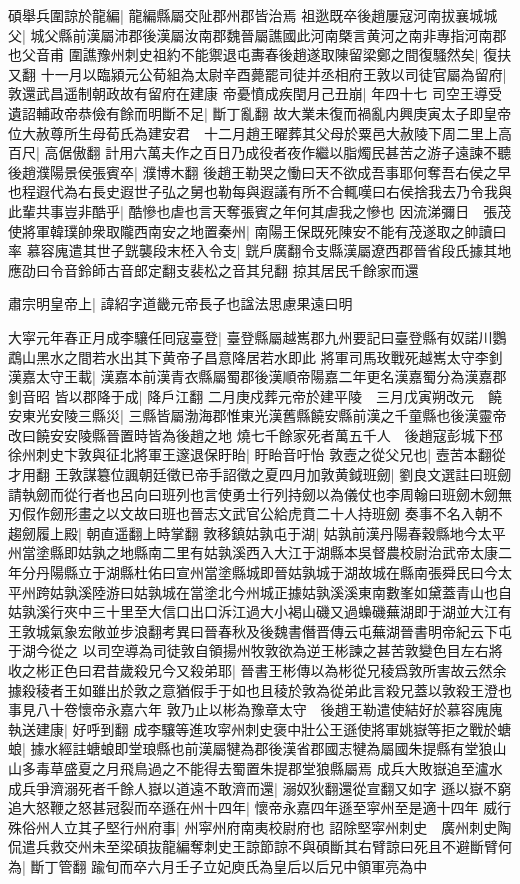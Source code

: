 碩舉兵圍諒於龍編|{
	龍編縣屬交阯郡州郡皆治焉}
祖逖既卒後趙屢寇河南拔襄城城父|{
	城父縣前漢屬沛郡後漢屬汝南郡魏晉屬譙國此河南槩言黄河之南非專指河南郡也父音甫}
圍譙豫州刺史祖約不能禦退屯夀春後趙遂取陳留梁鄭之間復騷然矣|{
	復扶又翻}
十一月以臨潁元公荀組為太尉辛酉薨罷司徒并丞相府王敦以司徒官屬為留府|{
	敦還武昌遥制朝政故有留府在建康}
帝憂憤成疾閏月己丑崩|{
	年四十七}
司空王導受遺詔輔政帝恭儉有餘而明斷不足|{
	斷丁亂翻}
故大業未復而禍亂内興庚寅太子即皇帝位大赦尊所生母荀氏為建安君　十二月趙王曜葬其父母於粟邑大赦陵下周二里上高百尺|{
	高倨傲翻}
計用六萬夫作之百日乃成役者夜作繼以脂燭民甚苦之游子遠諫不聽　後趙濮陽景侯張賓卒|{
	濮博木翻}
後趙王勒哭之慟曰天不欲成吾事耶何奪吾右侯之早也程遐代為右長史遐世子弘之舅也勒每與遐議有所不合輒嘆曰右侯捨我去乃令我與此輩共事豈非酷乎|{
	酷慘也虐也言天奪張賓之年何其虐我之慘也}
因流涕彌日　張茂使將軍韓璞帥衆取隴西南安之地置秦州|{
	南陽王保既死陳安不能有茂遂取之帥讀曰率}
慕容廆遣其世子皝襲段末柸入令支|{
	皝戶廣翻令支縣漢屬遼西郡晉省段氏據其地應劭曰令音鈴師古音郎定翻支裴松之音其兒翻}
掠其居民千餘家而還

肅宗明皇帝上|{
	諱紹字道畿元帝長子也諡法思慮果遠曰明}


大寜元年春正月成李驤任囘寇臺登|{
	臺登縣屬越嶲郡九州要記曰臺登縣有奴諾川鸚鵡山黑水之間若水出其下黄帝子昌意降居若水即此}
將軍司馬玫戰死越嶲太守李釗漢嘉太守王載|{
	漢嘉本前漢青衣縣屬蜀郡後漢順帝陽嘉二年更名漢嘉蜀分為漢嘉郡釗音昭}
皆以郡降于成|{
	降戶江翻}
二月庚戍葬元帝於建平陵　三月戊寅朔改元　饒安東光安陵三縣災|{
	三縣皆屬渤海郡惟東光漢舊縣饒安縣前漢之千童縣也後漢靈帝改曰饒安安陵縣晉置時皆為後趙之地}
燒七千餘家死者萬五千人　後趙寇彭城下邳徐州刺史卞敦與征北將軍王邃退保盱眙|{
	盱眙音吁怡}
敦壼之從父兄也|{
	壼苦本翻從才用翻}
王敦謀簒位諷朝廷徵已帝手詔徵之夏四月加敦黄鉞班劒|{
	劉良文選註曰班劒請執劒而從行者也呂向曰班列也言使勇士行列持劒以為儀仗也李周翰曰班劒木劒無刃假作劒形畫之以文故曰班也晉志文武官公給虎賁二十人持班劒}
奏事不名入朝不趨劒履上殿|{
	朝直遥翻上時掌翻}
敦移鎮姑孰屯于湖|{
	姑孰前漢丹陽春穀縣地今太平州當塗縣即姑孰之地縣南二里有姑孰溪西入大江于湖縣本吳督農校尉治武帝太康二年分丹陽縣立于湖縣杜佑曰宣州當塗縣城即晉姑孰城于湖故城在縣南張舜民曰今太平州跨姑孰溪陸游曰姑孰城在當塗北今州城正據姑孰溪溪東南數峯如黛蓋青山也自姑孰溪行夾中三十里至大信口出口泝江過大小褐山磯又過蟂磯蕪湖即于湖並大江有王敦城氣象宏敞並步浪翻考異曰晉春秋及後魏書僭晋傳云屯蕪湖晉書明帝紀云下屯于湖今從之}
以司空導為司徒敦自領揚州牧敦欲為逆王彬諫之甚苦敦變色目左右將收之彬正色曰君昔歲殺兄今又殺弟耶|{
	晉書王彬傳以為彬從兄稜爲敦所害故云然余據殺稜者王如雖出於敦之意猶假手于如也且稜於敦為從弟此言殺兄蓋以敦殺王澄也事見八十卷懷帝永嘉六年}
敦乃止以彬為豫章太守　後趙王勒遣使結好於慕容廆廆執送建康|{
	好呼到翻}
成李驤等進攻寜州刺史褒中壯公王遜使將軍姚嶽等拒之戰於螗蜋|{
	據水經註螗蜋即堂琅縣也前漢屬犍為郡後漢省郡國志犍為屬國朱提縣有堂狼山山多毒草盛夏之月飛鳥過之不能得去蜀置朱提郡堂狼縣屬焉}
成兵大敗嶽追至瀘水成兵爭濟溺死者千餘人嶽以道遠不敢濟而還|{
	溺奴狄翻還從宣翻又如字}
遜以嶽不窮追大怒鞭之怒甚冠裂而卒遜在州十四年|{
	懷帝永嘉四年遜至寜州至是適十四年}
威行殊俗州人立其子堅行州府事|{
	州寜州府南夷校尉府也}
詔除堅寜州刺史　廣州刺史陶侃遣兵救交州未至梁碩抜龍編奪刺史王諒節諒不與碩斷其右臂諒曰死且不避斷臂何為|{
	斷丁管翻}
踰旬而卒六月壬子立妃庾氏為皇后以后兄中領軍亮為中

